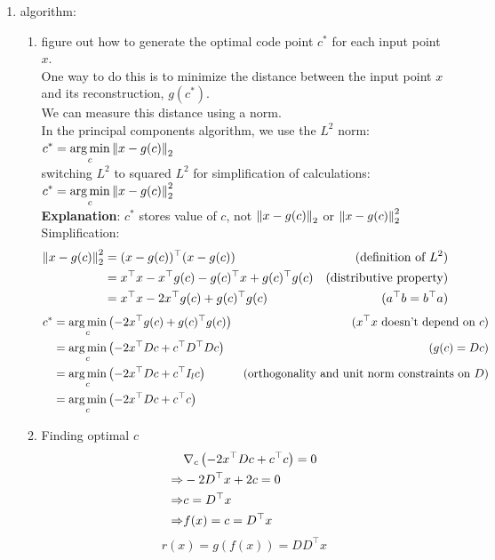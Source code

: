 \begin{enumerate}
    \item algorithm:
    \begin{enumerate}
        \item figure out how to generate the optimal code point $c^\ast$ for each input point $x$.\\
        One way to do this is to minimize the distance between the input point $x$ and its reconstruction, $g(c^\ast)$.\\
        We can measure this distance using a norm.\\
        In the principal components algorithm, we use the $L^2$ norm:
        ${
            \displaystyle
            c^\ast
            = \mathop{\arg\min}_c \left\| x - g(c) \right\|_2
        }$\\
        switching $L^2$ to squared $L^2$ for simplification of calculations:
        ${
            \displaystyle
            c^\ast
            = \mathop{\arg\min}_c \left\| x - g(c) \right\|_2^2
        }$\\
        \textbf{Explanation}: $c^\ast$ stores value of $c$, not $\left\| x - g(c) \right\|_2$ or $\left\| x - g(c) \right\|_2^2$\\
        Simplification:
        \[
        \begin{aligned}
            \left\| x - g(c) \right\|_2^2 
            &=(x-g(c))^\top(x-g(c)) & \text{(definition of $L^2$)}\\
            &= x^\top x - x^\top g(c) - g(c)^\top x + g(c)^\top g(c) & \text{(distributive property)}\\
            &= x^\top x - 2x^\top g(c) + g(c)^\top g(c) & (a^\top b = b^\top a)\\
        \end{aligned}
        \]
        \[
            \begin{aligned}
            c^\ast 
            &= \mathop{\arg\min}_c \left(- 2x^\top g(c) + g(c)^\top g(c)\right) & \text{($x^\top x$ doesn't depend on $c$)}\\
            &= \mathop{\arg\min}_c \left(- 2x^\top Dc + c^\top D^\top Dc\right) & (g(c) = Dc)\\
            &= \mathop{\arg\min}_c \left(- 2x^\top Dc + c^\top I_l c\right) & \text{(orthogonality and unit norm constraints on $D$)}\\
            &= \mathop{\arg\min}_c \left(- 2x^\top Dc + c^\top c\right)\\
            \end{aligned}
        \]

        \item 
        Finding optimal $c$
        \[
        \begin{aligned}
            &\nabla_c\left(-2x^\top Dc + c^\top c\right) = 0 \\
            \Rightarrow & -2D^\top x + 2c = 0 \\
            \Rightarrow & c = D^\top x \\
            \Rightarrow & f(x) = c = D^\top x \\
        \end{aligned}
        \]
        \[
            r(x) = g(f(x)) = DD^\top x
        \]


\end{enumerate}
\end{enumerate}
